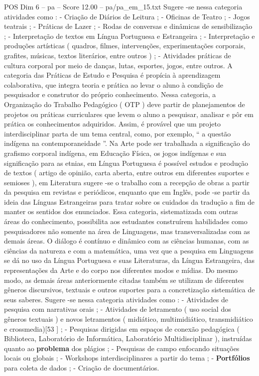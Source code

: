 \begin{textsample}{POS Dim 6 – pa – Score 12.00 – pa/pa\_em\_15.txt}
Sugere -se nessa categoria atividades como : - Criação de Diários de Leitura ; - Oficinas de Teatro ; - Jogos teatrais ; - Práticas de Lazer ; - Rodas de conversas e dinâmicas de sensibilização ; - Interpretação de textos em Língua Portuguesa e Estrangeira ; - Interpretação e produções artísticas ( quadros, filmes, intervenções, experimentações corporais, grafites, músicas, textos literários, entre outros ) ; - Atividades práticas de cultura corporal por meio de danças, lutas, esportes, jogos, entre outros.
A categoria das Práticas de Estudo e Pesquisa é propícia à aprendizagem colaborativa, que integra teoria e prática ao levar o aluno à condição de pesquisador e construtor do próprio conhecimento.
Nessa categoria, a Organização do Trabalho Pedagógico ( OTP ) deve partir de planejamentos de projetos ou práticas curriculares que levem o aluno a pesquisar, analisar e pôr em prática os conhecimentos adquiridos.
Assim, é provável que um projeto interdisciplinar parta de um tema central, como, por exemplo, “ a questão indígena na contemporaneidade ”.
Na Arte pode ser trabalhada a significação do grafismo corporal indígena, em Educação Física, os jogos indígenas e sua significação para as etnias, em Língua Portuguesa é possível estudos e produção de textos ( artigo de opinião, carta aberta, entre outros em diferentes suportes e semioses ), em Literatura sugere -se o trabalho com a recepção de obras a partir da pesquisa em revistas e periódicos, enquanto que em Inglês, pode -se partir da ideia das Línguas Estrangeiras para tratar sobre os cuidados da tradução a fim de manter os sentidos dos enunciados.
Essa categoria, sistematizada com outras áreas do conhecimento, possibilita aos estudantes construírem habilidades como pesquisadores não somente na área de Linguagens, mas transversalizadas com as demais áreas.
O diálogo é contínuo e dinâmico com as ciências humanas, com as ciências da natureza e com a matemática, uma vez que a pesquisa em Linguagens se dá no uso da Língua Portuguesa e suas Literaturas, da Língua Estrangeira, das representações da Arte e do corpo nos diferentes modos e mídias.
Do mesmo modo, as demais áreas anteriormente citadas também se utilizam de diferentes gêneros discursivos, textuais e outros suportes para a concretização sistemática de seus saberes.
Sugere -se nessa categoria atividades como : - Atividades de pesquisa com narrativas orais ; - Atividades de letramento ( uso social dos gêneros textuais ) e novos letramentos ( midiático, multimidiático, transmidiático e crossmedia)[53 ] ; - Pesquisas dirigidas em espaços de conexão pedagógica ( Biblioteca, Laboratório de Informática, Laboratório Multidisciplinar ), instruídas quanto ao \textbf{problema} dos plágios ; - Pesquisas de campo enfocando situações locais ou globais ; - Workshops interdisciplinares a partir do tema ; - \textbf{Portfólios} para coleta de dados ; - Criação de documentários.

\end{textsample}

